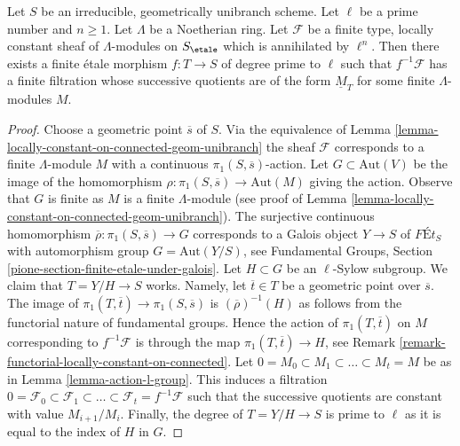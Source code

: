 \begin{lemma}
\label{lemma-pullback-filtered-modules}
Let $S$ be an irreducible, geometrically unibranch scheme.
Let $\ell$ be a prime number and $n \geq 1$. Let $\Lambda$
be a Noetherian ring. Let $\mathcal{F}$ be a finite type,
locally constant sheaf of $\Lambda$-modules on $S_\etale$
which is annihilated by $\ell^n$. Then there exists a
finite \'etale morphism $f : T \to S$ of degree prime to $\ell$
such that $f^{-1}\mathcal{F}$ has a finite filtration whose
successive quotients are of the form $\underline{M}_T$
for some finite $\Lambda$-modules $M$.
\end{lemma}

\begin{proof}
Choose a geometric point $\overline{s}$ of $S$.
Via the equivalence of
Lemma \ref{lemma-locally-constant-on-connected-geom-unibranch}
the sheaf $\mathcal{F}$ corresponds to a finite $\Lambda$-module
$M$ with a continuous $\pi_1(S, \overline{s})$-action.
Let $G \subset \text{Aut}(V)$ be the image of the homomorphism
$\rho : \pi_1(S, \overline{s}) \to \text{Aut}(M)$ giving the action.
Observe that $G$ is finite as $M$ is a finite $\Lambda$-module
(see proof of Lemma \ref{lemma-locally-constant-on-connected-geom-unibranch}).
The surjective continuous homomorphism
$\overline{\rho} : \pi_1(S, \overline{s}) \to G$
corresponds to a Galois object $Y \to S$ of
$\textit{F\'Et}_S$ with automorphism group $G = \text{Aut}(Y/S)$, see
Fundamental Groups, Section \ref{pione-section-finite-etale-under-galois}.
Let $H \subset G$ be an $\ell$-Sylow subgroup.
We claim that $T = Y/H \to S$ works. Namely, let $\overline{t} \in T$
be a geometric point over $\overline{s}$. The image of
$\pi_1(T, \overline{t}) \to \pi_1(S, \overline{s})$
is $(\overline{\rho})^{-1}(H)$ as follows from the functorial
nature of fundamental groups. Hence the action of $\pi_1(T, \overline{t})$
on $M$ corresponding to $f^{-1}\mathcal{F}$ is through
the map $\pi_1(T, \overline{t}) \to H$, see
Remark \ref{remark-functorial-locally-constant-on-connected}.
Let $0 = M_0 \subset M_1 \subset \ldots \subset M_t = M$
be as in Lemma \ref{lemma-action-l-group}.
This induces a filtration
$0 = \mathcal{F}_0 \subset \mathcal{F}_1 \subset \ldots
\subset \mathcal{F}_t = f^{-1}\mathcal{F}$
such that the successive quotients are constant with
value $M_{i + 1}/M_i$.
Finally, the degree of $T = Y/H \to S$ is prime to $\ell$
as it is equal to the index of $H$ in $G$.
\end{proof}






